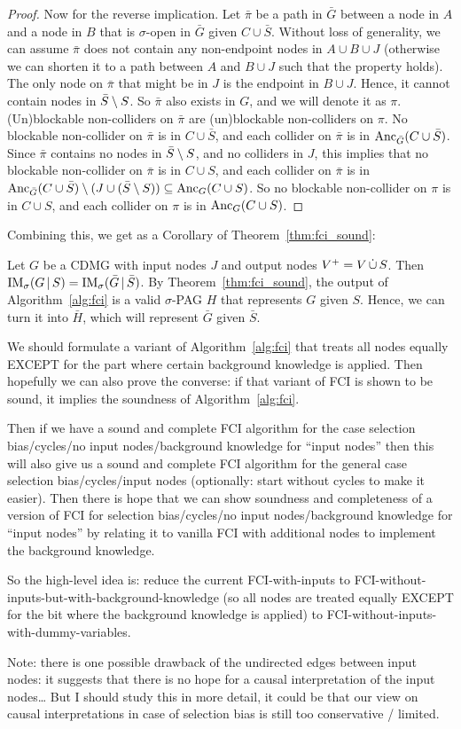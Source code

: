 {\begin{proof}
  Now for the reverse implication.
  Let $\bar{\pi}$ be a path in $\bar{G}$ between a node in $A$ and a node in $B$ that is $\sigma$-open in $\bar{G}$ given $C \cup \bar{S}$.
  Without loss of generality, we can assume $\bar{\pi}$ does not contain any non-endpoint nodes in $A \cup B \cup J$ (otherwise we can shorten it to a path between $A$ and $B \cup J$ such that the property holds).
  The only node on $\bar{\pi}$ that might be in $J$ is the endpoint in $B \cup J$.
  Hence, it cannot contain nodes in $\bar{S} \setminus S$.
  So $\bar{\pi}$ also exists in $G$, and we will denote it as $\pi$.
  (Un)blockable non-colliders on $\bar{\pi}$ are (un)blockable non-colliders on $\pi$.
  No blockable non-collider on $\bar{\pi}$ is in $C \cup \bar{S}$, and each collider on $\bar{\pi}$ is in $\mathrm{Anc}_{\bar{G}}(C \cup \bar{S})$.
  Since $\bar{\pi}$ contains no nodes in $\bar{S} \setminus S$, and no colliders in $J$, this implies that  no blockable non-collider on $\bar{\pi}$ is in $C \cup S$, and each collider on $\bar{\pi}$ is in $\mathrm{Anc}_{\bar{G}}(C \cup \bar{S}) \setminus (J \cup (\bar{S} \setminus S)) \subseteq \mathrm{Anc}_G(C \cup S)$.
  So no blockable non-collider on $\pi$ is in $C \cup S$, and each collider on $\pi$ is in $\mathrm{Anc}_{G}(C \cup S)$.
\end{proof}
Combining this, we get as a Corollary of Theorem~\ref{thm:fci_sound}:
\begin{Cor}
  Let $G$ be a CDMG with input nodes $J$ and output nodes $V^+ = V \,\dot{\cup}\, S$.
  Then $\mathrm{IM}_\sigma(G \operatorname*{|} S) = \mathrm{IM}_\sigma(\bar{G} \operatorname*{|} \bar{S})$.
  By Theorem~\ref{thm:fci_sound}, the output of Algorithm~\ref{alg:fci} is a valid $\sigma$-PAG $H$ that represents $G$ given $S$.
  Hence, we can turn it into $\bar{H}$, which will represent $\bar{G}$ given $\bar{S}$.
\end{Cor}
We should formulate a variant of Algorithm~\ref{alg:fci} that treats all nodes equally EXCEPT for the part where certain background knowledge is applied.
Then hopefully we can also prove the converse: if that variant of FCI is shown to be sound, it implies the soundness of Algorithm~\ref{alg:fci}.

Then if we have a sound and complete FCI algorithm for the case selection bias/cycles/no input nodes/background knowledge for ``input nodes'' then this will also give us a sound and complete FCI algorithm for the general case selection bias/cycles/input nodes (optionally: start without cycles to make it easier).
Then there is hope that we can show soundness and completeness of a version of FCI for selection bias/cycles/no input nodes/background knowledge for ``input nodes'' by relating it to vanilla FCI with additional nodes to implement the background knowledge.

So the high-level idea is: reduce the current FCI-with-inputs to FCI-without-inputs-but-with-background-knowledge (so all nodes are treated equally EXCEPT for the bit where the background knowledge is applied) to FCI-without-inputs-with-dummy-variables.

Note: there is one possible drawback of the undirected edges between input nodes: it suggests that there is no hope for a causal interpretation of the input nodes\dots
But I should study this in more detail, it could be that our view on causal interpretations in case of selection bias is still too conservative / limited.
}
